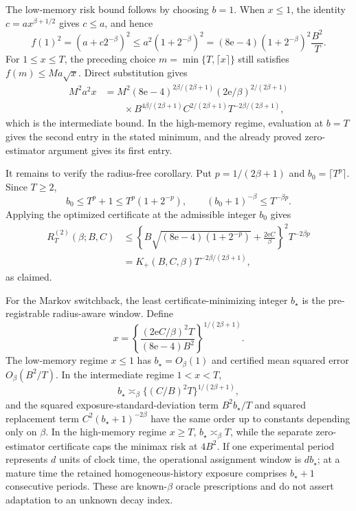 The low-memory risk bound follows by choosing \(b=1\).  When \(x\le1\), the identity \(c=ax^{\beta+1/2}\) gives \(c\le a\), and hence
\[
 f(1)^2=(a+c2^{-\beta})^2
 \le a^2(1+2^{-\beta})^2
 =(8\mathrm e-4)(1+2^{-\beta})^2\frac{B^2}{T}.
\]
For \(1\le x\le T\), the preceding choice \(m=\min\{T,\lceil x\rceil\}\) still satisfies \(f(m)\le M a\sqrt x\).  Direct substitution gives
\[
 \begin{aligned}
 M^2a^2x
 &=M^2(8\mathrm e-4)^{2\beta/(2\beta+1)}
 (2\mathrm e/\beta)^{2/(2\beta+1)}\\
 &\qquad\times
 B^{4\beta/(2\beta+1)}C^{2/(2\beta+1)}
 T^{-2\beta/(2\beta+1)},
 \end{aligned}
\]
which is the intermediate bound.  In the high-memory regime, evaluation at \(b=T\) gives the second entry in the stated minimum, and the already proved zero-estimator argument gives its first entry.

It remains to verify the radius-free corollary.  Put \(p=1/(2\beta+1)\) and \(b_0=\lceil T^p\rceil\).  Since \(T\ge2\),
\[
 b_0\le T^p+1\le T^p(1+2^{-p}),
 \qquad
 (b_0+1)^{-\beta}\le T^{-\beta p}.
\]
Applying the optimized certificate at the admissible integer \(b_0\) gives
\[
 \begin{aligned}
 R_T^{(2)}(\beta;B,C)
 &\le
 \left\{
 B\sqrt{(8\mathrm e-4)(1+2^{-p})}
 +\frac{2\mathrm e C}{\beta}
 \right\}^2T^{-2\beta p}\\
 &=K_+(B,C,\beta)T^{-2\beta/(2\beta+1)},
 \end{aligned}
\]
as claimed.

For the Markov switchback, the least certificate-minimizing integer \(b_\star\) is the pre-registrable radius-aware window.  Define
\[
 x=\left\{
 \frac{(2\mathrm e C/\beta)^2T}{(8\mathrm e-4)B^2}
 \right\}^{1/(2\beta+1)}.
\]
The low-memory regime \(x\le1\) has \(b_\star=O_\beta(1)\) and certified mean squared error \(O_\beta(B^2/T)\).  In the intermediate regime \(1<x<T\),
\[
 b_\star\asymp_\beta\{(C/B)^2T\}^{1/(2\beta+1)},
\]
and the squared exposure-standard-deviation term \(B^2b_\star/T\) and squared replacement term \(C^2(b_\star+1)^{-2\beta}\) have the same order up to constants depending only on \(\beta\).  In the high-memory regime \(x\ge T\), \(b_\star\asymp_\beta T\), while the separate zero-estimator certificate caps the minimax risk at \(4B^2\).  If one experimental period represents \(d\) units of clock time, the operational assignment window is \(db_\star\); at a mature time the retained homogeneous-history exposure comprises \(b_\star+1\) consecutive periods.  These are known-\(\beta\) oracle prescriptions and do not assert adaptation to an unknown decay index.

